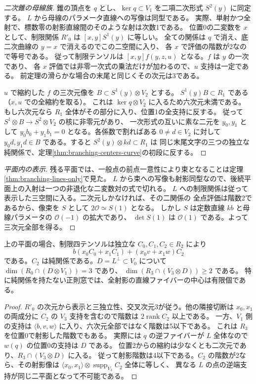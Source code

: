 \begin{proof}[二次錐の母線族]
錐の頂点を $q$ とし、$\ker q\subset V_1$ を二項二次形式 $S^2(y)$ に同定する。
$L$ から母線のパラメータ直線への写像は同型である。
実際、単射かつ全射で、標数零の射影直線間のそのような射は次数1である。
位置0の二変数を $x$ として、制限関係 $R'_0$ は $[x,y]S^1(y)$ に等しい。
全ての関係は $q$ で消え、底二次曲線の $y=x$ で消えるのでこの二空間に入り、
各 $x$ で評価の階数が2なので等号である。
従って制限テンソルは $[x,y]f(y,z,u)$ となる。$f$ は $y$ の一次であり、
各 $x$ 評価では非零一次式の乗法だけが加わるので、$u$ 支持は一定である。
前定理の滑らかな場合の末尾と同じくその次元は3である。

$u$ で縮約した $f$ の三次元像を $B\subset S^1(y)\otimes V_2$ とする。
$S^1(y)B\subset R_1$ である（$x,u$ での全縮約を取る）。
これは $\ker q\otimes V_2$ に入るため六次元未満である。
もし六次元なら $R_1$ 全体がその部分に入り、位置1の全支持に反する。
従って $S^1\otimes B\to S^2\otimes V_2$ の核に非零元があり、
一次形式の互いに素な二元を $y_0,y_1$ として
$y_0 b_0+y_1 b_1=0$ となる。各係数で割ればある $0\ne d\in V_2$ に対して
$y_0d,y_1d\in B$ である。すると $S^2(y)\otimes kd\subset R_1$ は
同じ末尾文字の三つの独立な純関係で、定理\ref{thm:branching-centers-curve}の初段に反する。
\end{proof}

\begin{proof}[平面内の表示]
残る平面では、一般点の前点一意性により束となることは定理\ref{thm:branching-lines-only}で見た。
$L$ から束への写像も射影同型なので、後続平面上の入射は一つの非退化な二変数対の式で切れる。
$L$ への制限関係は従って表示した三空間に入る。二次元しかなければ、その二関係の
全点評価は階数2であるから、像束を $S$ として $2\mathcal O\simeq S(1)$ となる。
しかし $S$ は定数直線 $kb$ と母線パラメータの $\mathcal O(-1)$ の拡大であり、
$\det S(1)$ は $\mathcal O(1)$ である。よって三次元全部を得る。
\end{proof}

\begin{corollary}\label{cor:rank-three-plane-branch-slice}
上の平面の場合、制限四テンソルは独立な $C_0,C_1,C_2\in R_2$ により
\[
           b(x_0 C_0+x_1 C_1)+(x_0 v+x_1 w)C_2
\]
である。$C_2$ は純関係である。$D=L^\perp\subset V_0$ について
$\dim(R_0\cap(D\otimes V_1))=3$ であり、
$\dim(R_3\cap(V_3\otimes D))\ge2$ である。
特に純関係を持たない正則窓では、全射影の直線ファイバーの中心は有限個である。
\end{corollary}
\begin{proof}
$R'_0$ の次元から表示と三独立性、交叉次元3が従う。他の隣接切断は $x_0,x_1$ の両成分に
$C_2$ の $V_3$ 支持を含むので階数は $2\operatorname{rank} C_2$ 以上である。
一方、$V_1$ 側の支持は $\langle b,v,w\rangle$ に入り、六次元全部ではなく階数は5以下である。
これは $R_3$ を位置0で射影した階数でもある。
実際には $q$ の逆ファイバーが $L$ 全体なので $w(q)$ の位置0の支持は $D$ である。
位置2からの縮約は少なくとも二次元であり、$R_3\cap(V_3\otimes D)$ に入る。
従って射影階数は4以下である。$C_2$ の階数が2なら、その射影像は
$\langle x_0,x_1\rangle\otimes \operatorname{supp}_{V_3} C_2$ 全体に等しく、
異なる $L$ の点の逆端支持が同じ二平面となって不可能である。
\end{proof}
